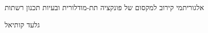 \begin{hebrew}

\begin{center}
{\Huge
אלגוריתמי קירוב למקסום של פונקציה תת-מודלורית ובעיות תכנון רשתות
}


{\huge
גלעד קותיאל
}
\end{center}
\end{hebrew}
